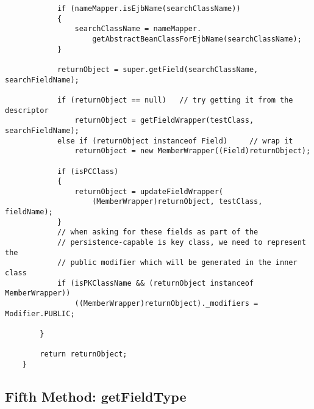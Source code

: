 \begin{lstlisting}
			if (nameMapper.isEjbName(searchClassName))
			{
				searchClassName = nameMapper.
					getAbstractBeanClassForEjbName(searchClassName);
			}

			returnObject = super.getField(searchClassName, searchFieldName);

			if (returnObject == null)	// try getting it from the descriptor
				returnObject = getFieldWrapper(testClass, searchFieldName);
			else if (returnObject instanceof Field)		// wrap it
				returnObject = new MemberWrapper((Field)returnObject);

			if (isPCClass)
			{
				returnObject = updateFieldWrapper(
					(MemberWrapper)returnObject, testClass, fieldName);
			}
			// when asking for these fields as part of the 
			// persistence-capable is key class, we need to represent the 
			// public modifier which will be generated in the inner class
			if (isPKClassName && (returnObject instanceof MemberWrapper))
				((MemberWrapper)returnObject)._modifiers = Modifier.PUBLIC;
			
		}

		return returnObject;
	}
\end{lstlisting}
	

\newpage
\subsection{Fifth Method: getFieldType} 

